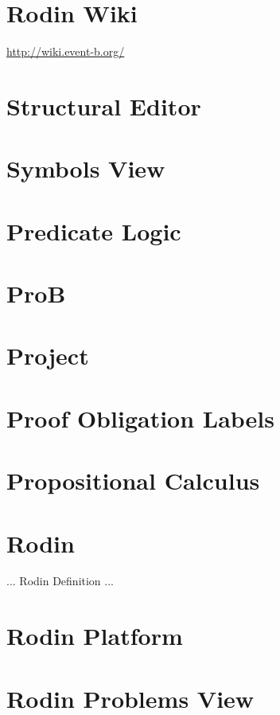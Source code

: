 \section{Rodin Wiki}
\label{rodin_wiki}

\url{http://wiki.event-b.org/}

\section{Structural Editor}
\label{structural_editor}

\section{Symbols View}
\label{symbols_view}

\section{Predicate Logic}
\label{predicate_logic}

\section{ProB}
\label{prob}

\section{Project}
\label{project}

\section{Proof Obligation Labels}
\label{po_labels}

\section{Propositional Calculus}
\label{propositional_calculus}

\section{Rodin}
\label{rodin}

... Rodin Definition ...


\section{Rodin Platform}
\label{rodin_platform}

\section{Rodin Problems View}
\label{rodin_problems_view}


